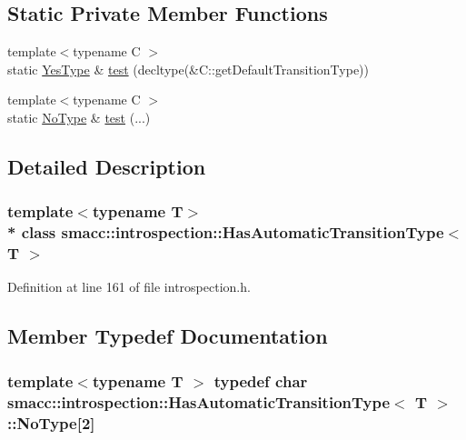 \subsection*{Static Private Member Functions}
\begin{DoxyCompactItemize}
\item 
{\footnotesize template$<$typename C $>$ }\\static \hyperlink{classsmacc_1_1introspection_1_1HasAutomaticTransitionType_abeb599df547eb3db36684b6cb343eade}{Yes\+Type} \& \hyperlink{classsmacc_1_1introspection_1_1HasAutomaticTransitionType_a3521b68e2adb57520d3ca8cfbea082fb}{test} (decltype(\&C\+::get\+Default\+Transition\+Type))
\item 
{\footnotesize template$<$typename C $>$ }\\static \hyperlink{classsmacc_1_1introspection_1_1HasAutomaticTransitionType_aa2e976214fc770f53aaae67fc049caab}{No\+Type} \& \hyperlink{classsmacc_1_1introspection_1_1HasAutomaticTransitionType_a660ac4a6eac5d86d133f2cfb905d22f3}{test} (...)
\end{DoxyCompactItemize}


\subsection{Detailed Description}
\subsubsection*{template$<$typename T$>$\\*
class smacc\+::introspection\+::\+Has\+Automatic\+Transition\+Type$<$ T $>$}



Definition at line 161 of file introspection.\+h.



\subsection{Member Typedef Documentation}
\subsubsection[{\texorpdfstring{No\+Type}{NoType}}]{\setlength{\rightskip}{0pt plus 5cm}template$<$typename T $>$ typedef char {\bf smacc\+::introspection\+::\+Has\+Automatic\+Transition\+Type}$<$ T $>$\+::No\+Type\mbox{[}2\mbox{]}\hspace{0.3cm}{\ttfamily [private]}}\hypertarget{classsmacc_1_1introspection_1_1HasAutomaticTransitionType_aa2e976214fc770f53aaae67fc049caab}{}\label{classsmacc_1_1introspection_1_1HasAutomaticTransitionType_aa2e976214fc770f53aaae67fc049caab}


